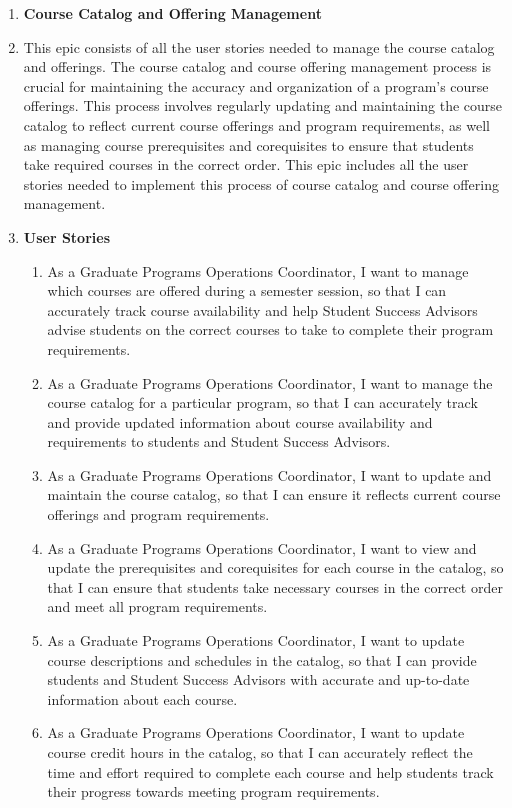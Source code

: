 \documentclass[12pt]{article}
\begin{document}
\begin{appendices}
\begin{enumerate}[label=(\roman*)]
        \item \textbf{Course Catalog and Offering Management}
        \item[] This epic consists of all the user stories needed to manage the course catalog and offerings. The course catalog and course offering management process is crucial for maintaining the accuracy and organization of a program's course offerings. This process involves regularly updating and maintaining the course catalog to reflect current course offerings and program requirements, as well as managing course prerequisites and corequisites to ensure that students take required courses in the correct order. This epic includes all the user stories needed to implement this process of course catalog and course offering management.
        \item[] \textbf{User Stories}
        \begin{enumerate}
            \item As a Graduate Programs Operations Coordinator, I want to manage which courses are offered during a semester session, so that I can accurately track course availability and help Student Success Advisors advise students on the correct courses to take to complete their program requirements.
            \item As a Graduate Programs Operations Coordinator, I want to manage the course catalog for a particular program, so that I can accurately track and provide updated information about course availability and requirements to students and Student Success Advisors.
            \item As a Graduate Programs Operations Coordinator, I want to update and maintain the course catalog, so that I can ensure it reflects current course offerings and program requirements.
            \item As a Graduate Programs Operations Coordinator, I want to view and update the prerequisites and corequisites for each course in the catalog, so that I can ensure that students take necessary courses in the correct order and meet all program requirements.
            \item As a Graduate Programs Operations Coordinator, I want to update course descriptions and schedules in the catalog, so that I can provide students and Student Success Advisors with accurate and up-to-date information about each course.
            \item As a Graduate Programs Operations Coordinator, I want to update course credit hours in the catalog, so that I can accurately reflect the time and effort required to complete each course and help students track their progress towards meeting program requirements.                                        
        \end{enumerate}



\end{enumerate}
\end{appendices}
\end{document}
